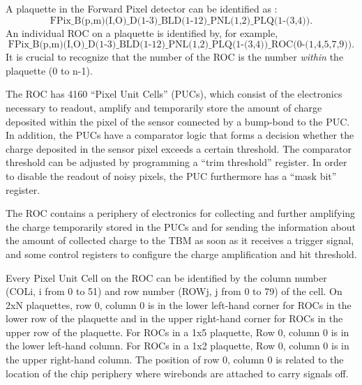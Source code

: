 \documentclass{cmspaper}
\begin{document}
A plaquette in the Forward Pixel detector can be identified as :
\begin{displaymath}
\mbox{FPix\_B(p,m)(I,O)\_D(1-3)\_BLD(1-12)\_PNL(1,2)\_PLQ(1-(3,4)).}
\end{displaymath}
An individual ROC on a plaquette is identified by, for example,
\begin{displaymath}
\mbox{FPix\_B(p,m)(I,O)\_D(1-3)\_BLD(1-12)\_PNL(1,2)\_PLQ(1-(3,4))\_ROC(0-(1,4,5,7,9)).}
\end{displaymath}
It is crucial to recognize that the number of the ROC is the number {\em within} the plaquette 
(0 to n-1).


The ROC has 4160 ``Pixel Unit Cells'' (PUCs),
which consist of the electronics necessary to readout, amplify and temporarily store
the amount of charge deposited within the pixel of the sensor
connected by a  bump-bond to  the PUC.
In addition, the PUCs have a comparator logic that forms a decision whether the charge
deposited in the sensor pixel exceeds a certain threshold.
The comparator threshold can be adjusted by programming a ``trim threshold'' register.
In order to disable the readout of noisy pixels,
the PUC furthermore has a ``mask bit'' register.

The ROC contains a periphery of electronics for collecting and further amplifying 
the charge temporarily stored in the PUCs and for sending the information about 
the amount of collected charge to the TBM as soon as it receives a trigger signal, 
and some control registers to configure the charge amplification and hit threshold.

Every Pixel Unit Cell on the ROC can be identified by 
the column number (COLi, i from 0 to 51) and row number (ROWj, j from 0 to 79) of the
cell. 
On 2xN plaquettes, row 0, column 0 is in the lower left-hand corner
for ROCs in the lower row of the plaquette and
in the upper right-hand corner for ROCs in the upper row of the plaquette.
For ROCs in a 1x5 plaquette, Row 0, column 0 is in the lower left-hand column.
For ROCs in a 1x2 plaquette, Row 0, column 0 is in the upper right-hand column.
The position of row 0, column 0 is related to the location of the
chip periphery where wirebonds are attached to carry signals off.
\end{document}
